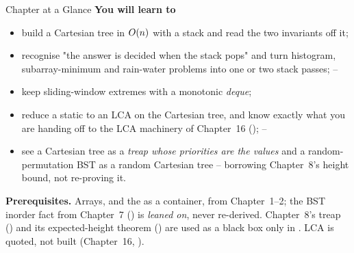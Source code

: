 \begin{chaptertheorybox}{Chapter at a Glance}
\textbf{You will learn to}
\begin{itemize}[nosep]
  \item build a Cartesian tree in $O(n)$ with a stack and read the two invariants off it; \hfill{}
  \item recognise "the answer is decided when the stack pops" and turn histogram, subarray-minimum
        and rain-water problems into one or two stack passes; \hfill{}--
  \item keep sliding-window extremes with a monotonic \emph{deque}; \hfill{}
  \item reduce a static  to an LCA on the Cartesian tree, and know exactly
        what you are handing off to the LCA machinery of Chapter~16 (); \hfill{}--
  \item see a Cartesian tree as a \emph{treap whose priorities are the values} and a random-permutation
        BST as a random Cartesian tree -- borrowing Chapter~8's height bound, not re-proving it. \hfill{}
\end{itemize}

\textbf{Prerequisites.} Arrays, and the  as a container, from Chapter~1--2; the BST
inorder fact from Chapter~7 () is \emph{leaned on}, never re-derived. Chapter~8's treap
() and its expected-height theorem () are used as a black
box only in . LCA is quoted, not built (Chapter~16, ).
\end{chaptertheorybox}

